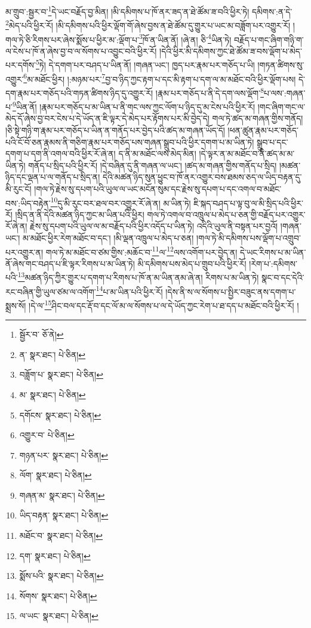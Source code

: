 མ་གྲུབ་:སྦྱར་བ་\footnote{སྦྱོར་བ་  ཅོ་ནེ། }དེ་ཡང་བརྗོད་བྱ་མིན། །མི་དམིགས་པ་ཁོ་ནར་ཟད་ན་ཐེ་ཚོམ་ཟ་བའི་ཕྱིར་ཏེ། དམིགས་:ན་དེ་\footnote{ན་  སྣར་ཐང་།  པེ་ཅིན། }མེད་པའི་ཕྱིར་རོ། །མི་དམིགས་པའི་ཕྱིར་ལྡོག་གོ་ཞེས་བྱས་ན་ཐེ་ཚོམ་དུ་གྱུར་པ་ཡང་མ་བཟློག་པར་འགྱུར་རོ། །གལ་ཏེ་ཅི་རིགས་པར་ཞེས་སྨོས་པ་ཕྱིར་མ་:ལྡོག་པ་\footnote{བཟློག་པ་  སྣར་ཐང་།  པེ་ཅིན། }ཁོ་ན་ཡིན་ནོ། །ཞེ་ན། ཅི་\footnote{མ་  སྣར་ཐང་།  པེ་ཅིན། }ཡིན་ཏེ། བརྗོད་པ་གང་ཞིག་གཉི་ག་ལ་ངེས་པ་ཁོ་ན་ཞེས་བྱ་བ་ལ་སོགས་པ་འབྱུང་བའི་ཕྱིར་རོ། །དེའི་ཕྱིར་མི་དམིགས་ཀྱང་ཐེ་ཚོམ་ཟ་བས་ལྡོག་པ་མེད་པར་དགོས་\footnote{དགོངས་  སྣར་ཐང་།  པེ་ཅིན། }ཏེ། དེ་དགག་པར་བཤད་པ་ཡིན་ནོ། །གཞན་ཡང་། ཁྱད་པར་རྣམ་པར་གཅོད་པ་ཡི། །གཏན་ཚིགས་སུ་འགྱུར་\footnote{འགྱུར་བ་  པེ་ཅིན། }མ་མཐོང་ཕྱིར། །:མཉམ་པར་\footnote{གཉན་པར་  སྣར་ཐང་།  པེ་ཅིན། }བྱ་བ་ཉིད་ཀྱང་རྟག་པ་དང་མི་རྟག་པ་དག་ལ་མ་མཐོང་བའི་ཕྱིར་ལྡོག་པས། དེ་དག་རྣམ་པར་གཅོད་པའི་གཏན་ཚིགས་ཉིད་དུ་འགྱུར་རོ། །རྣམ་པར་གཅོད་པ་ནི་དེ་དག་ལས་ལྡོག་\footnote{ལོག་  སྣར་ཐང་།  པེ་ཅིན། }པ་ལས་:གཞན་པ་\footnote{གཞན་མ་  སྣར་ཐང་།  པེ་ཅིན། }ཡིན་ནོ། །རྣམ་པར་གཅོད་པ་མ་ཡིན་པ་ནི་གང་ལས་ཀྱང་ལོག་པ་ཉིད་དུ་མ་ངེས་པའི་ཕྱིར་རོ། །གང་ཞིག་གང་ལ་མེད་དོ་ཞེས་བྱ་བར་ངེས་པ་དེ་ཡོད་ན་ཇི་ལྟར་དེ་མེད་པར་རྟོགས་པར་མི་བྱེད་དེ། གལ་ཏེ་ཚད་མ་གཞན་གྱིས་གནོད། །ཅི་སྟེ་གཉི་ག་རྣམ་པར་གཅོད་པ་ཡིན་ན་གནོད་པར་བྱེད་པའི་ཚད་མ་གཞན་ཡོད་དོ། །ཕན་ཚུན་རྣམ་པར་གཅོད་པའི་ངོ་བོ་ཅན་རྣམས་ནི་གཅིག་རྣམ་པར་གཅོད་པས་གཞན་སྒྲུབ་པའི་ཕྱིར་དགག་པ་མ་ཡིན་ཏེ། སྒྲུབ་པ་དང་དགག་པ་དག་ནི་འགལ་བའི་ཕྱིར་རོ་ཞེ་ན། ད་ནི་མ་མཐོང་ལས་མེད་མིན། །དེ་ལྟར་ན་མ་མཐོང་བ་ནི་ཚད་མ་མ་ཡིན་ཏེ། གནོད་པ་སྲིད་པའི་ཕྱིར་རོ། །དེ་བཞིན་དུ་ནི་གཞན་ལ་ཡང་། །ཚད་མ་གཞན་གྱིས་གནོད་པ་སྲིད། །མཚན་ཉིད་དང་ལྡན་པ་ལ་གནོད་པ་སྲིད་ན། དེའི་མཚན་ཉིད་སུན་ཕྱུང་བ་ཁོ་ནར་འགྱུར་བས་ཐམས་ཅད་ལ་ཡིད་བརྟན་དུ་མི་རུང་ངོ། །གལ་ཏེ་རྗེས་སུ་དཔག་པའི་ཡུལ་ལ་ཡང་མངོན་སུམ་དང་རྗེས་སུ་དཔག་པ་དང་འགལ་བ་མཐོང་བས་:ཡིད་བརྟེན་\footnote{ཡིད་བརྟན་  སྣར་ཐང་།  པེ་ཅིན། }དུ་མི་རུང་བར་ཐལ་བར་འགྱུར་རོ་ཞེ་ན། མ་ཡིན་ཏེ། ཇི་སྐད་བཤད་པ་ལྟ་བུ་ལ་མི་སྲིད་པའི་ཕྱིར་རོ། །སྲིད་ན་ནི་དེའི་མཚན་ཉིད་ཀྱང་མ་ཡིན་པའི་ཕྱིར། གལ་ཏེ་འགལ་བ་འཁྲུལ་པ་མེད་པ་ཅན་གྱི་བརྗོད་པར་འགྱུར་རོ་ཞེ་ན། རྗེས་སུ་དཔག་པའི་ཡུལ་ལ་མ་བརྗོད་པའི་ཕྱིར་འདོད་པ་ཡིན་ཏེ། འདིའི་ཡུལ་ནི་བསྟན་པར་བྱའོ། །གཞན་ཡང་། མ་མཐོང་ཕྱིར་རེག་མཐོང་བ་དང་། །མི་ལྡན་འཁྲུལ་པ་མེད་པ་ཅན། །གལ་ཏེ་མི་དམིགས་པས་ལྡོག་པ་འགྲུབ་པར་འགྱུར་ན། གལ་ཏེ་མ་མཐོང་བ་ཙམ་གྱིས་:མཆོང་བ་\footnote{མཐོང་བ་  སྣར་ཐང་།  པེ་ཅིན། }ལ་\footnote{དག་  སྣར་ཐང་།  པེ་ཅིན། }ལས་འགོག་པར་བྱེད་ན། དེ་ཡང་རིགས་པ་མ་ཡིན་ནོ་ཞེས་གང་བཤད་པ་ཇི་ལྟར་རིགས་པ་མ་ཡིན་ཏེ། མི་དམིགས་པས་མེད་པ་གྲུབ་པའི་ཕྱིར་རོ། །རེག་པ་:དམིགས་པའི་\footnote{སྨོས་པའི་  སྣར་ཐང་།  པེ་ཅིན། }མཚན་ཉིད་ཀྱིར་གྱུར་པ་དགག་པ་རིགས་པ་ཁོ་ན་མ་ཡིན་ནམ་ཞེ་ན། རིགས་པ་མ་ཡིན་ཏེ། སྣང་བ་དང་དེའི་རང་བཞིན་གྱི་ཡུལ་ཙམ་ལ་འགོག་\footnote{སོགས་  སྣར་ཐང་།  པེ་ཅིན། }པ་མ་ཡིན་པའི་ཕྱིར་རོ། །དེས་ནི་ས་ལ་སོགས་པ་སྤྱིར་བཟུང་ནས་དགག་པ་སྨྲས་སོ། །དེ་ལ་\footnote{ལ་ཡང་  སྣར་ཐང་།  པེ་ཅིན། }ཤིང་བལ་དང་རྡོ་བ་དང་ལོ་མ་ལ་སོགས་པ་ལ་དེ་ཡོད་ཀྱང་རེག་པ་ཐ་དད་པ་མཐོང་བའི་ཕྱིར་རོ། །
